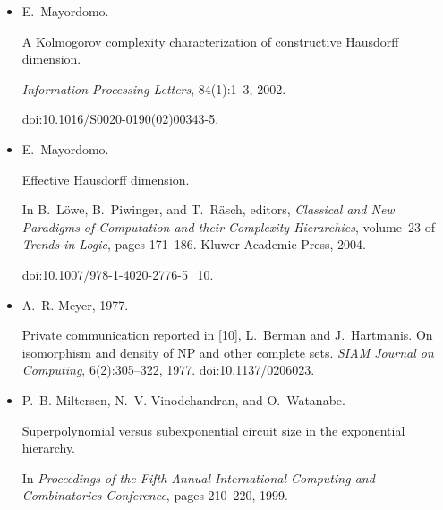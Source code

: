 \documentclass[10pt,a4paper]{article}
\begin{document}
\begin{itemize}
E. Mayordomo.


\emph{Contributions to the study of resource-bounded measure}.


PhD thesis, Universitat Politècnica de Catalunya, 1994.


URL:
https://eccc.weizmann.ac.il/static/books/Contributions\_to\_the\_Study\_of\_Resource\_Bounded\_Measure/.





\item[] 
[61]

E. Mayordomo.


A Kolmogorov complexity characterization of constructive
Hausdorff dimension.


\emph{Information Processing Letters}, 84(1):1–3, 2002.


doi:10.1016/S0020-0190(02)00343-5.





\item[] 
[62]

E. Mayordomo.


Effective Hausdorff dimension.


In B. Löwe, B. Piwinger, and T. Räsch, editors, \emph{Classical and New Paradigms of Computation and their Complexity Hierarchies},
volume 23 of \emph{Trends in Logic}, pages 171–186. Kluwer Academic Press,
2004.


doi:10.1007/978-1-4020-2776-5\_10.





\item[] 
[63]

A. R. Meyer, 1977.


Private communication reported in [10], L. Berman and
J. Hartmanis. On isomorphism and density of NP and other complete sets.
\emph{SIAM Journal on Computing}, 6(2):305–322, 1977.
doi:10.1137/0206023.





\item[] 
[64]

P. B. Miltersen, N. V. Vinodchandran, and O. Watanabe.


Superpolynomial versus subexponential circuit size in the exponential
hierarchy.


In \emph{Proceedings of the Fifth Annual International Computing and
Combinatorics Conference}, pages 210–220, 1999.



\end{itemize}
\end{document}
